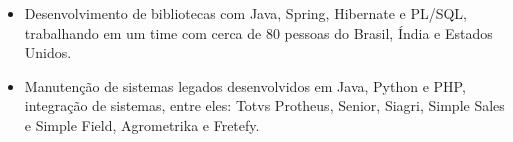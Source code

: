 \documentclass[10pt,a4paper,ragged2e]{altacv}
\begin{document}

\begin{fullwidth}
\makecvheader
\end{fullwidth}




\begin{itemize}
  \item Desenvolvimento de bibliotecas com Java, Spring, Hibernate e PL/SQL, trabalhando em um time com cerca de 80 pessoas do Brasil, Índia e Estados Unidos.
\end{itemize}

\vspace{10px}

\begin{itemize}
  \item Manutenção de sistemas legados desenvolvidos em Java, Python e PHP, integração de sistemas, entre eles: Totvs Protheus, Senior, Siagri, Simple Sales e Simple Field, Agrometrika e Fretefy.
\end{itemize}
\end{document}
